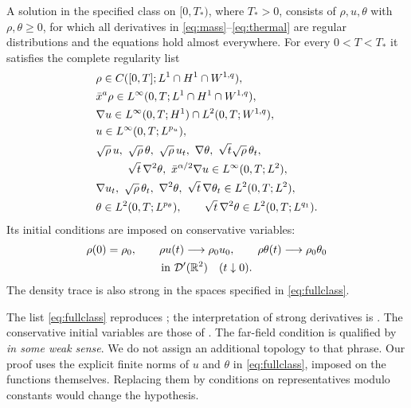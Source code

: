 \documentclass[10pt,twoside]{article}
\newcommand{\R}{\mathbb R}
\begin{document}
\begin{definition}\label{def:solution}
A solution in the specified class on $[0,T_*)$, where $T_*>0$, consists
of $\rho,u,\theta$ with $\rho,\theta\ge0$, for which all derivatives
in \eqref{eq:mass}--\eqref{eq:thermal} are regular distributions and
the equations hold almost everywhere. For every $0<T<T_*$ it satisfies
the complete regularity list
\begin{equation}
 \begin{aligned}
 &\rho\in C([0,T];L^1\cap H^1\cap W^{1,q}),\\
 &\bar x^a\rho\in L^\infty(0,T;L^1\cap H^1\cap W^{1,q}),\\
 &\nabla u\in L^\infty(0,T;H^1)
                \cap L^2(0,T;W^{1,q}),\\
 &u\in L^\infty(0,T;L^{p_u}),\\
 &\sqrt\rho\,u,\ \sqrt\rho\,\theta,\ \sqrt\rho\,u_t,\
       \nabla\theta,\ \sqrt t\sqrt\rho\,\theta_t,\\
 &\hspace{10mm}\sqrt t\,\nabla^2\theta,\
       \bar x^{\alpha/2}\nabla u
                       \in L^\infty(0,T;L^2),\\
 &\nabla u_t,\ \sqrt\rho\,\theta_t,\ \nabla^2\theta,\
       \sqrt t\,\nabla\theta_t
                       \in L^2(0,T;L^2),\\
 &\theta\in L^2(0,T;L^{p_\theta}),\qquad
       \sqrt t\,\nabla^2\theta\in L^2(0,T;L^{q_1}).
 \end{aligned}\label{eq:fullclass}
\end{equation}
Its initial conditions are imposed on conservative variables:
\begin{equation}
 \begin{gathered}
 \rho(0)=\rho_0,\qquad
 \rho u(t)\longrightarrow\rho_0u_0,\qquad
 \rho\theta(t)\longrightarrow\rho_0\theta_0\\
 \hbox{in }\mathcal D'(\R^2)\quad(t\downarrow0).
 \end{gathered}
 \label{eq:traces}
\end{equation}
The density trace is also strong in the spaces specified in
\eqref{eq:fullclass}.
\end{definition}

The list \eqref{eq:fullclass} reproduces \cite[(1.8)]{WangV1};
the interpretation of strong derivatives is
\cite[Definition 1.1]{WangV1}. The conservative initial variables
are those of \cite[(1.3)]{WangV1}. The far-field condition
\cite[(1.4)]{WangV1} is qualified by \emph{in some weak sense}.
We do not assign an additional topology to that phrase. Our proof
uses the explicit finite norms of $u$ and $\theta$ in
\eqref{eq:fullclass}, imposed on the functions themselves.
Replacing them by conditions on representatives modulo constants
would change the hypothesis.
\end{document}
